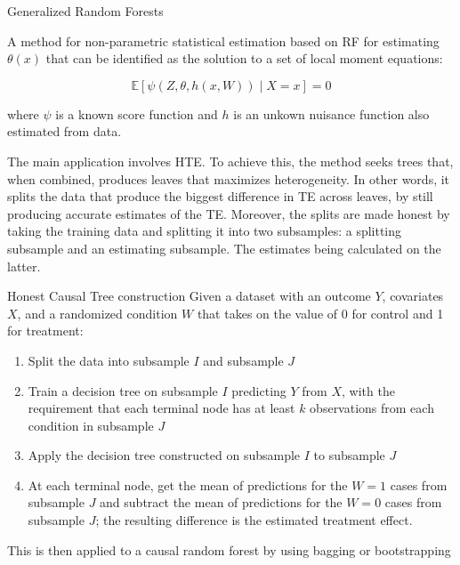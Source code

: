 \documentclass[9pt]{beamer}
\begin{document}
\begin{frame}[label = GRF]{Generalized Random Forests}

A method for non-parametric statistical estimation based on RF
for estimating $\theta(x)$ that can be identified as the solution to a set of local moment equations:

\[\mathbb{E}[\psi(Z,\theta,h(x,W))\;|\;X=x]=0\]

where $\psi$ is a known score function and $h$ is an unkown nuisance function also estimated from data.\\

\vspace{5mm}

The main application involves HTE. To achieve this, the method seeks trees that, when combined, produces leaves that maximizes heterogeneity. In other words, it splits the data that produce the biggest difference in TE across leaves, by still producing accurate estimates of the TE. Moreover, the splits are made honest by taking the training data and splitting it into two subsamples: a splitting subsample and an estimating subsample. The estimates being calculated on the latter. \hyperlink{hte}{}\\

\end{frame}



\begin{frame}{Honest Causal Tree construction}
Given a dataset with an outcome $Y$, covariates $X$, and a randomized condition $W$ that takes on the value of 0 for control and 1 for treatment:

\begin{enumerate}
\item Split the data into subsample $I$ and subsample $J$

\item Train a decision tree on subsample $I$ predicting $Y$ from $X$, with the requirement that each terminal node has at least $k$ observations from each condition in subsample $J$

\item Apply the decision tree constructed on subsample $I$ to subsample $J$

\item At each terminal node, get the mean of predictions for the $W = 1$ cases from subsample $J$ and subtract the mean of predictions for the $W = 0$ cases from subsample $J$; the resulting difference is the estimated treatment effect.

\end{enumerate}

This is then applied to a causal random forest by using bagging or bootstrapping

\end{frame}
\end{document}

